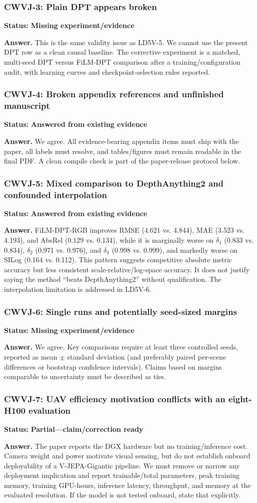 \documentclass[10pt]{article}
\newcommand{\answered}{\textcolor{answered}{\textbf{Answered from existing evidence}}}
\newcommand{\partialstatus}{\textcolor{partial}{\textbf{Partial---claim/correction ready}}}
\newcommand{\missing}{\textcolor{missing}{\textbf{Missing experiment/evidence}}}
\newenvironment{reviewpoint}[2]
  {\subsubsection{#1}\noindent\textbf{Status:} #2\par\smallskip}
  {}
\begin{document}
\begin{reviewpoint}{CWVJ-3: Plain DPT appears broken}{\missing}
\textbf{Answer.} This is the same validity issue as LD5V-5. We cannot use the present DPT
row as a clean causal baseline. The corrective experiment is a matched, multi-seed DPT
versus FiLM-DPT comparison after a training/configuration audit, with learning curves and
checkpoint-selection rules reported.
\end{reviewpoint}

\begin{reviewpoint}{CWVJ-4: Broken appendix references and unfinished manuscript}{\answered}
\textbf{Answer.} We agree. All evidence-bearing appendix items must ship with the paper,
all labels must resolve, and tables/figures must remain readable in the final PDF. A clean
compile check is part of the paper-release protocol below.
\end{reviewpoint}

\begin{reviewpoint}{CWVJ-5: Mixed comparison to DepthAnything2 and confounded interpolation}{\answered}
\textbf{Answer.} FiLM-DPT-RGB improves RMSE (4.621 vs. 4.844), MAE (3.523 vs. 4.193),
and AbsRel (0.129 vs. 0.134), while it is marginally worse on $\delta_1$ (0.833 vs.
0.834), $\delta_2$ (0.971 vs. 0.976), and $\delta_3$ (0.998 vs. 0.999), and markedly
worse on SILog (0.164 vs. 0.112). This pattern suggests competitive absolute metric
accuracy but less consistent scale-relative/log-space accuracy. It does not justify saying
the method ``beats DepthAnything2'' without qualification. The interpolation limitation is
addressed in LD5V-6.
\end{reviewpoint}

\begin{reviewpoint}{CWVJ-6: Single runs and potentially seed-sized margins}{\missing}
\textbf{Answer.} We agree. Key comparisons require at least three controlled seeds,
reported as mean $\pm$ standard deviation (and preferably paired per-scene differences or
bootstrap confidence intervals). Claims based on margins comparable to uncertainty must be
described as ties.
\end{reviewpoint}

\begin{reviewpoint}{CWVJ-7: UAV efficiency motivation conflicts with an eight-H100 evaluation}{\partialstatus}
\textbf{Answer.} The paper reports the DGX hardware but no training/inference cost. Camera
weight and power motivate visual sensing, but do not establish onboard deployability of a
V-JEPA-Gigantic pipeline. We must remove or narrow any deployment implication and report
trainable/total parameters, peak training memory, training GPU-hours, inference latency,
throughput, and memory at the evaluated resolution. If the model is not tested onboard,
state that explicitly.
\end{reviewpoint}
\end{document}
